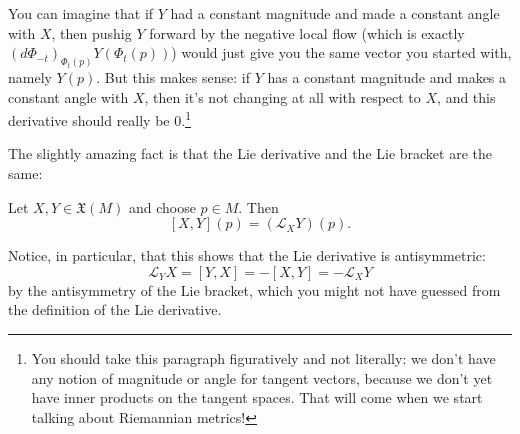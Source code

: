 You can imagine that if $Y$ had a constant magnitude and made a constant angle with $X$, then pushig $Y$ forward by the negative local flow (which is exactly $(d\Phi_{-t})_{\Phi_t(p)}Y(\Phi_t(p))$) would just give you the same vector you started with, namely $Y(p)$. But this makes sense: if $Y$ has a constant magnitude and makes a constant angle with $X$, then it's not changing at all with respect to $X$, and this derivative should really be 0.\footnote{You should take this paragraph figuratively and not literally: we don't have any notion of magnitude or angle for tangent vectors, because we don't yet have inner products on the tangent spaces. That will come when we start talking about Riemannian metrics!}

The slightly amazing fact is that the Lie derivative and the Lie bracket are the same:

\begin{proposition}\label{prop:Lie bracket = Lie derivative}
	Let $X,Y \in \mathfrak{X}(M)$ and choose $p \in M$. Then
	\[
		[X,Y](p) = (\mathcal{L}_XY)(p).
	\]
\end{proposition}

Notice, in particular, that this shows that the Lie derivative is antisymmetric:
\[
	\mathcal{L}_YX = [Y,X] = -[X,Y] = - \mathcal{L}_XY
\]
by the antisymmetry of the Lie bracket, which you might not have guessed from the definition of the Lie derivative.

